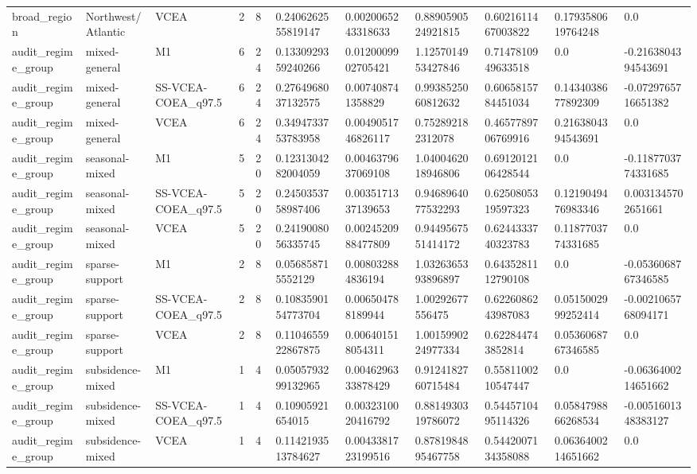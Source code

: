 \begin{landscape}
\begin{longtable}{lllllllllll}
broad\_region & Northwest/Atlantic & VCEA & 2 & 8 & 0.2406262555819147 & 0.0020065243318633 & 0.8890590524921815 & 0.6021611467003822 & 0.1793580619764248 & 0.0 \\
audit\_regime\_group & mixed-general & M1 & 6 & 24 & 0.1330929359240266 & 0.0120009902705421 & 1.1257014953427846 & 0.7147810949633518 & 0.0 & -0.2163804394543691 \\
audit\_regime\_group & mixed-general & SS-VCEA-COEA\_q97.5 & 6 & 24 & 0.2764968037132575 & 0.007408741358829 & 0.9938525060812632 & 0.6065815784451034 & 0.1434038677892309 & -0.0729765716651382 \\
audit\_regime\_group & mixed-general & VCEA & 6 & 24 & 0.3494733753783958 & 0.0049051746826117 & 0.752892182312078 & 0.4657789706769916 & 0.2163804394543691 & 0.0 \\
audit\_regime\_group & seasonal-mixed & M1 & 5 & 20 & 0.1231304282004059 & 0.0046379637069108 & 1.0400462018946806 & 0.6912012106428544 & 0.0 & -0.1187703774331685 \\
audit\_regime\_group & seasonal-mixed & SS-VCEA-COEA\_q97.5 & 5 & 20 & 0.2450353758987406 & 0.0035171337139653 & 0.9468964077532293 & 0.6250805319597323 & 0.1219049476983346 & 0.0031345702651661 \\
audit\_regime\_group & seasonal-mixed & VCEA & 5 & 20 & 0.2419008056335745 & 0.0024520988477809 & 0.9449567551414172 & 0.6244333740323783 & 0.1187703774331685 & 0.0 \\
audit\_regime\_group & sparse-support & M1 & 2 & 8 & 0.056858715552129 & 0.008032884836194 & 1.0326365393896897 & 0.6435281112790108 & 0.0 & -0.0536068767346585 \\
audit\_regime\_group & sparse-support & SS-VCEA-COEA\_q97.5 & 2 & 8 & 0.1083590154773704 & 0.006504788189944 & 1.00292677556475 & 0.6226086243987083 & 0.0515002999252414 & -0.0021065768094171 \\
audit\_regime\_group & sparse-support & VCEA & 2 & 8 & 0.1104655922867875 & 0.006401518054311 & 1.0015990224977334 & 0.622844743852814 & 0.0536068767346585 & 0.0 \\
audit\_regime\_group & subsidence-mixed & M1 & 1 & 4 & 0.0505793299132965 & 0.0046296333878429 & 0.9124182760715484 & 0.5581100210547447 & 0.0 & -0.0636400214651662 \\
audit\_regime\_group & subsidence-mixed & SS-VCEA-COEA\_q97.5 & 1 & 4 & 0.10905921654015 & 0.0032310020416792 & 0.8814930319786072 & 0.5445710495114326 & 0.0584798866268534 & -0.0051601348383127 \\
audit\_regime\_group & subsidence-mixed & VCEA & 1 & 4 & 0.1142193513784627 & 0.0043381723199516 & 0.8781984895467758 & 0.5442007134358088 & 0.0636400214651662 & 0.0 \\

\end{longtable}
\end{landscape}
